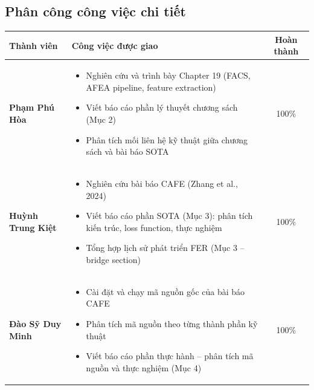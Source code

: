 \documentclass[12pt,a4paper]{article}
\let\oldtextbf\textbf
\renewcommand{\textbf}[1]{\oldtextbf{\textcolor{hcmublue}{#1}}}
\begin{document}
\subsection{Phân công công việc chi tiết}

\begin{table}[H]
\centering
\small
\begin{tabularx}{\textwidth}{|l|X|c|}
\hline
\textbf{Thành viên} & \textbf{Công việc được giao} & \textbf{Hoàn thành} \\ \hline

\textbf{Phạm Phú Hòa} &
\begin{minipage}[t]{\linewidth}
\begin{itemize}[leftmargin=*,nosep,after=\strut]
    \item[-] Nghiên cứu và trình bày Chapter 19 (FACS, AFEA pipeline, feature extraction)
    \item[-] Viết báo cáo phần lý thuyết chương sách (Mục 2)
    \item[-] Phân tích mối liên hệ kỹ thuật giữa chương sách và bài báo SOTA
\end{itemize}
\end{minipage} & 100\% \\ \hline

\textbf{Huỳnh Trung Kiệt} &
\begin{minipage}[t]{\linewidth}
\begin{itemize}[leftmargin=*,nosep,after=\strut]
    \item[-] Nghiên cứu bài báo CAFE (Zhang et al., 2024)
    \item[-] Viết báo cáo phần SOTA (Mục 3): phân tích kiến trúc, loss function, thực nghiệm
    \item[-] Tổng hợp lịch sử phát triển FER (Mục 3 -- bridge section)
\end{itemize}
\end{minipage} & 100\% \\ \hline

\textbf{Đào Sỹ Duy Minh} &
\begin{minipage}[t]{\linewidth}
\begin{itemize}[leftmargin=*,nosep,after=\strut]
    \item[-] Cài đặt và chạy mã nguồn gốc của bài báo CAFE
    \item[-] Phân tích mã nguồn theo từng thành phần kỹ thuật
    \item[-] Viết báo cáo phần thực hành -- phân tích mã nguồn và thực nghiệm (Mục 4)
\end{itemize}
\end{minipage} & 100\% \\ \hline


\end{tabularx}
\end{table}
\end{document}
